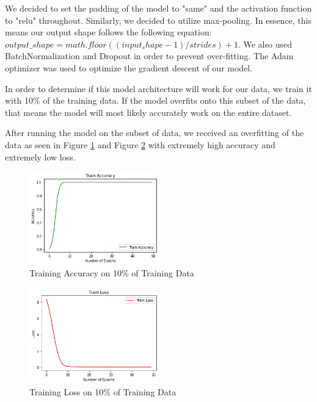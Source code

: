 \documentclass[paper=a4, fontsize=11pt]{scrartcl}
\numberwithin{equation}{section}		%
\numberwithin{table}{section}				%
\begin{document}
We decided to set the padding of the model to "same" and the activation function to "relu" throughout. Similarly, we decided to utilize max-pooling. In essence, this means our output shape follows the following equation: $output\_shape = math.floor((input_shape - 1) / strides) + 1$. We also used BatchNormalization and Dropout in order to prevent over-fitting. The Adam optimizer was used to optimize the gradient descent of our model.

In order to determine if this model architecture will work for our data, we train it with 10\% of the training data. If the model overfits onto this subset of the data, that means the model will most likely accurately work on the entire dataset.

After running the model on the subset of data, we received an overfitting of the data as seen in Figure \ref{fig:cnn_acc_10p} and Figure \ref{fig:cnn_loss_10p} with extremely high accuracy and extremely low loss.

\begin{figure}[h]
    \centering
    \includegraphics[width=0.5\textwidth]{training_cnn_acc_10p.png}
    \caption{Training Accuracy on 10\% of Training Data}
    \label{fig:cnn_acc_10p}
\end{figure}

\begin{figure}[h]
    \centering
    \includegraphics[width=0.5\textwidth]{training_10p_loss.png}
    \caption{Training Loss on 10\% of Training Data}
    \label{fig:cnn_loss_10p}
\end{figure}
\end{document}
